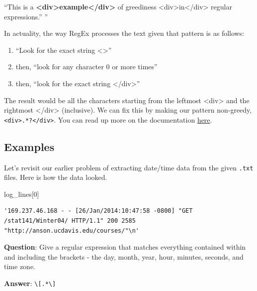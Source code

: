 \documentclass[
  letterpaper,
  DIV=11,
  numbers=noendperiod]{scrreprt}
\newenvironment{Shaded}{\begin{snugshade}}{\end{snugshade}}
\newcommand{\DecValTok}[1]{\textcolor[rgb]{0.68,0.00,0.00}{#1}}
\newcommand{\NormalTok}[1]{\textcolor[rgb]{0.00,0.23,0.31}{#1}}
\begin{document}
``This is a
\textbf{\textless div\textgreater example\textless/div\textgreater{}} of
greediness \textless div\textgreater in\textless/div\textgreater{}
regular expressions.'' ''

In actuality, the way RegEx processes the text given that pattern is as
follows:

\begin{enumerate}
\def\labelenumi{\arabic{enumi}.}
\item
  ``Look for the exact string \textless{}\div\textgreater{}''
\item
  then, ``look for any character 0 or more times''
\item
  then, ``look for the exact string \textless/div\textgreater{}''
\end{enumerate}

The result would be all the characters starting from the leftmost
\textless div\textgreater{} and the rightmost
\textless/div\textgreater{} (inclusive). We can fix this by making our
pattern non-greedy,
\texttt{\textless{}div\textgreater{}.*?\textless{}/div\textgreater{}}.
You can read up more on the documentation
\href{https://docs.python.org/3/howto/regex.html\#greedy-versus-non-greedy}{here}.

\subsection{Examples}\label{examples-2}

Let's revisit our earlier problem of extracting date/time data from the
given \texttt{.txt} files. Here is how the data looked.

\begin{Shaded}
\begin{Highlighting}[]
\NormalTok{log\_lines[}\DecValTok{0}\NormalTok{]}
\end{Highlighting}
\end{Shaded}

\begin{verbatim}
'169.237.46.168 - - [26/Jan/2014:10:47:58 -0800] "GET /stat141/Winter04/ HTTP/1.1" 200 2585 "http://anson.ucdavis.edu/courses/"\n'
\end{verbatim}

\textbf{Question}: Give a regular expression that matches everything
contained within and including the brackets - the day, month, year,
hour, minutes, seconds, and time zone.

\textbf{Answer}: \texttt{\textbackslash{}{[}.*\textbackslash{}{]}}
\end{document}
